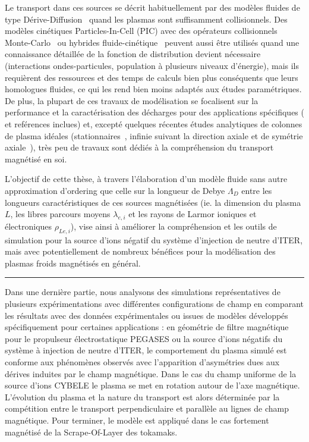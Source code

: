 \begin{refsection}
Le transport dans ces sources se décrit habituellement par des modèles fluides
de type Dérive-Diffusion~\parencite{Porteous,Lieberman,Rozhansky} quand les
plasmas sont suffisamment collisionnels. Des modèles
cinétiques Particles-In-Cell (PIC) avec des opérateurs collisionnels
Monte-Carlo~\parencite{PIC3D,Adam} ou hybrides
fluide-cinétique~\parencite{BoeufGarrigues} peuvent aussi être utilisés quand
une connaissance détaillée de la fonction de distribution devient nécessaire
(interactions ondes-particules, population à plusieurs niveaux d'énergie), mais
ils requièrent des ressources et des temps de calculs bien plus conséquents que
leurs homologues fluides, ce qui les rend bien moins adaptés aux études
paramétriques. De plus, la plupart de ces travaux de modélisation se focalisent
sur la performance et la caractérisation des décharges pour des applications
spécifiques (\parencite{Lieberman} et reférences inclues) et, excepté quelques
récentes études analytiques de colonnes de plasma idéales
(stationnaires~\parencite{Sternberg}, infinie suivant la direction axiale et de
symétrie axiale~\parencite{Fruchtman}), très peu de travaux sont dédiés à la
compréhension du transport magnétisé en soi.


				
L'objectif de cette thèse, à travers l'élaboration d'un modèle fluide sans
autre approximation d'ordering que celle sur la longueur de Debye
$\Lambda_D$ entre les longueurs caractéristiques de ces sources magnétisées (ie.
la dimension du plasma $L$, les libres parcours moyens $\lambda_{e,i}$ et les rayons de Larmor ioniques et électroniques
$\rho_{Le,i}$),
vise ainsi à améliorer la compréhension et les outils de simulation pour
la source d'ions négatif du système d'injection de neutre d'ITER, mais avec
potentiellement de nombreux bénéfices pour la modélisation des plasmas froids magnétisés en général.
		
\begin{center}
\rule{0.6\textwidth}{1pt}
\end{center}	
	
		Dans une dernière partie, nous analysons des simulations représentatives de
		plusieurs expérimentations avec différentes configurations de champ en comparant
		les résultats avec des données expérimentales ou issues de modèles développés
		spécifiquement pour certaines applications :
		en géométrie de filtre magnétique pour le propulseur électrostatique PEGASES
		ou la source d'ions négatifs du système à injection de neutre d'ITER, le
		comportement du plasma simulé est conforme aux phénomènes observés avec
		l’apparition d’asymétries dues aux dérives induites par le champ magnétique.
		Dans le cas du champ uniforme de la source d'ions CYBELE le plasma se met en
		rotation autour de l'axe magnétique. L'évolution du plasma et la nature du
		transport est alors déterminée par la compétition entre le transport
		perpendiculaire et parallèle au lignes de champ magnétique. Pour terminer, le
		modèle est appliqué dans le cas fortement magnétisé de la Scrape-Of-Layer des
		tokamaks.
		


%
%
\end{refsection}

